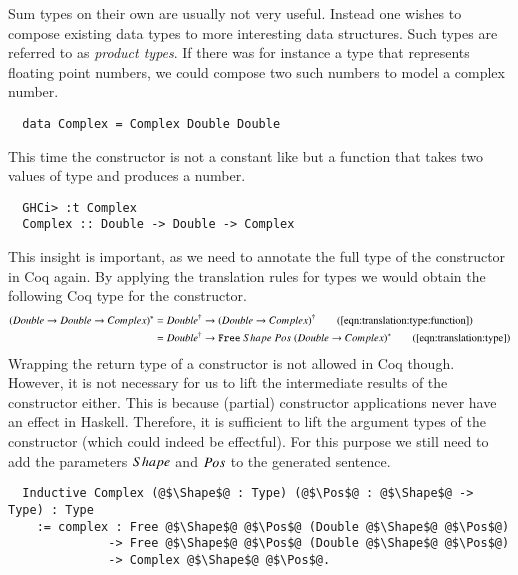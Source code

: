 Sum types on their own are usually not very useful.
Instead one wishes to compose existing data types to more interesting data structures.
Such types are referred to as \textit{product types}.
If there was for instance a type  that represents floating point numbers, we could compose two such numbers to model a complex number.
\begin{verbatim}
  data Complex = Complex Double Double
\end{verbatim}
This time the constructor  is not a constant like  but a function that takes two values of type  and produces a  number.
\begin{verbatim}
  GHCi> :t Complex
  Complex :: Double -> Double -> Complex
\end{verbatim}
This insight is important, as we need to annotate the full type of the constructor in Coq again.
By applying the translation rules for types we would obtain the following Coq type for the constructor.
\begin{align*}
  \toCoqT{(Double \rightarrow Double \rightarrow Complex)}
    &= \toCoq{Double} \rightarrow \toCoq{(Double \rightarrow Complex)}
    \tag{\autoref{eqn:translation:type:function}}
    \\
    &= \toCoq{Double} \rightarrow \Free{\toCoqT{(Double \rightarrow Complex)}}
    \tag{\autoref{eqn:translation:type}}
\end{align*}
Wrapping the return type of a constructor is not allowed in Coq though.
However, it is not necessary for us to lift the intermediate results of the constructor either.
This is because (partial) constructor applications never have an effect in Haskell.
Therefore, it is sufficient to lift the argument types of the constructor (which could indeed be effectful).
For this purpose we still need to add the parameters $Shape$ and $Pos$ to the generated sentence.
\begin{verbatim}
  Inductive Complex (@$\Shape$@ : Type) (@$\Pos$@ : @$\Shape$@ -> Type) : Type
    := complex : Free @$\Shape$@ @$\Pos$@ (Double @$\Shape$@ @$\Pos$@)
              -> Free @$\Shape$@ @$\Pos$@ (Double @$\Shape$@ @$\Pos$@)
              -> Complex @$\Shape$@ @$\Pos$@.
\end{verbatim}

